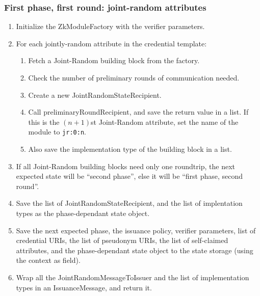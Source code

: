   \subsubsection{First phase, first round: joint-random attributes}
  \notimplemented
  \begin{enumerate}
    \item Initialize the ZkModuleFactory with the verifier parameters.
    \item For each jointly-random attribute in the credential template:
      \begin{enumerate}
        \item Fetch a Joint-Random building block from the factory.
        \item Check the number of preliminary rounds of communication needed.
        \item Create a new JointRandomStateRecipient.
        \item Call preliminaryRoundRecipient, and save the return value in a list. If this is the $(n+1)$st Joint-Random attribute,
          set the name of the module to \texttt{jr:0:n}.
        \item Also save the implementation type of the building block in a list.
      \end{enumerate}
      \item If all Joint-Random building blocks need only one roundtrip, the next expected state will be ``second phase'', else
        it will be ``first phase, second round''.
      \item Save the list of JointRandomStateRecipient, and the list of implentation types as the phase-dependant state object.
      \item Save the next expected phase, the issuance policy, verifier parameters, list of credential URIs, the list of
        pseudonym URIs, the list of self-claimed attributes, and the phase-dependant state object to the state storage (using the context as field).
      \item Wrap all the JointRandomMessageToIssuer and the list of implementation types in an IssuanceMessage, and return it.
  \end{enumerate}

